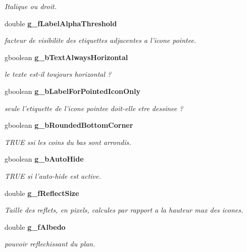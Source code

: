\begin{CompactItemize}
\begin{CompactList}\small\item\em Italique ou droit. \item\end{CompactList}\item 
double {\bf g\_\-fLabelAlphaThreshold}
\begin{CompactList}\small\item\em facteur de visibilite des etiquettes adjacentes a l'icone pointee. \item\end{CompactList}\item 
gboolean {\bf g\_\-bTextAlwaysHorizontal}
\begin{CompactList}\small\item\em le texte est-il toujours horizontal ? \item\end{CompactList}\item 
gboolean {\bf g\_\-bLabelForPointedIconOnly}
\begin{CompactList}\small\item\em seule l'etiquette de l'icone pointee doit-elle etre dessinee ? \item\end{CompactList}\item 
gboolean {\bf g\_\-bRoundedBottomCorner}
\begin{CompactList}\small\item\em TRUE ssi les coins du bas sont arrondis. \item\end{CompactList}\item 
gboolean {\bf g\_\-bAutoHide}
\begin{CompactList}\small\item\em TRUE si l'auto-hide est active. \item\end{CompactList}\item 
double {\bf g\_\-fReflectSize}
\begin{CompactList}\small\item\em Taille des reflets, en pixels, calcules par rapport a la hauteur max des icones. \item\end{CompactList}\item 
double {\bf g\_\-fAlbedo}
\begin{CompactList}\small\item\em pouvoir reflechissant du plan. \item\end{CompactList}\item 

\end{CompactItemize}
